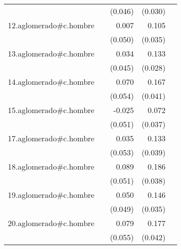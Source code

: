 {\begin{longtable}{l*{4}{D{.}{.}{-1}}}
            &                     &     (0.046)         &     (0.030)         &                     \\
\addlinespace
12.aglomerado#c.hombre&                     &       0.007         &       0.105\sym{**} &                     \\
            &                     &     (0.050)         &     (0.035)         &                     \\
\addlinespace
13.aglomerado#c.hombre&                     &       0.034         &       0.133\sym{***}&                     \\
            &                     &     (0.045)         &     (0.028)         &                     \\
\addlinespace
14.aglomerado#c.hombre&                     &       0.070         &       0.167\sym{***}&                     \\
            &                     &     (0.054)         &     (0.041)         &                     \\
\addlinespace
15.aglomerado#c.hombre&                     &      -0.025         &       0.072         &                     \\
            &                     &     (0.051)         &     (0.037)         &                     \\
\addlinespace
17.aglomerado#c.hombre&                     &       0.035         &       0.133\sym{***}&                     \\
            &                     &     (0.053)         &     (0.039)         &                     \\
\addlinespace
18.aglomerado#c.hombre&                     &       0.089         &       0.186\sym{***}&                     \\
            &                     &     (0.051)         &     (0.038)         &                     \\
\addlinespace
19.aglomerado#c.hombre&                     &       0.050         &       0.146\sym{***}&                     \\
            &                     &     (0.049)         &     (0.035)         &                     \\
\addlinespace
20.aglomerado#c.hombre&                     &       0.079         &       0.177\sym{***}&                     \\
            &                     &     (0.055)         &     (0.042)         &                     \\

\end{longtable}}
